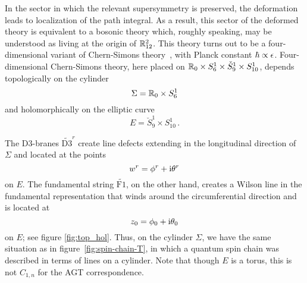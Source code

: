 In the sector in which the relevant supersymmetry is preserved, the
deformation leads to localization of the path integral.  As a result,
this sector of the deformed theory is equivalent to a bosonic theory
which, roughly speaking, may be understood as living at the origin of
$\mathbb{R}^2_{12}$.  This theory turns out to be a four-dimensional variant
of Chern-Simons theory~\cite{Costello:2018txb}, with Planck constant
$\hbar \propto \epsilon$.  Four-dimensional Chern-Simons theory, here
placed on $\mathbb{R}_0 \times S^1_6 \times \check{S}^1_9 \times S^1_{10}$,
depends topologically on the cylinder
\begin{equation}
  \Sigma = \mathbb{R}_0 \times S^1_6
\end{equation}
and holomorphically on the elliptic curve
\begin{equation}
  E = \check{S}^1_9 \times S^1_{10} \,.
\end{equation}


The D3-branes $\widetilde{\mathrm{D3}}^r$ create line defects
extending in the longitudinal direction of $\Sigma$ and located at the
points
\begin{equation}
  w^r = \phi^r + \mathrm{i}\theta^r
\end{equation}
on $E$.  The fundamental string $\widetilde{\mathrm{F1}}$, on the
other hand, creates a Wilson line in the fundamental representation that
winds around the circumferential direction and is located at
\begin{equation}
  z_0 = \phi_0 + \mathrm{i}\theta_0
\end{equation}
on $E$; see figure \ref{fig:top_hol}.  Thus, on the cylinder $\Sigma$, we have the same situation as
in figure~\ref{fig:spin-chain-T}, in which a quantum spin chain was
described in terms of lines on a cylinder.
Note that though $E$ is a torus, this is not $C_{1,n}$ for
the AGT correspondence.


